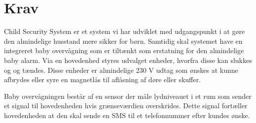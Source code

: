\chapter{Krav}
Child Security System er et system vi har udviklet med udgangspunkt i at gøre den almindelige husstand mere sikker for børn. Samtidig skal systemet have en integreret baby overvågning som er tiltænkt som erstatning for den almindelige baby alarm.
Via en hovedenhed styres udvalget enheder, hvorfra disse kan slukkes og og tændes. Disse enheder er almindelige 230 V udtag som ønskes at kunne afbrydes eller syre en magnetlås til aflåsning af døre eller skuffer.

Baby overvågningen består af en sensor der måle lydniveauet i et rum som sender et signal til hovedenheden hvis grænseværdien overskrides. Dette signal fortæller hovedenheden at den skal sende en SMS til et telefonnummer efter kundes ønske.   
